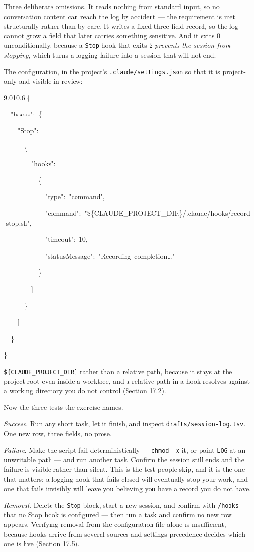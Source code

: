 \documentclass[11pt,a4paper,twoside,openany]{book}
\newcommand{\cl}[1]{\noindent\mbox{#1}\par}
\begin{document}
Three deliberate omissions. It reads nothing from standard input, so no conversation content can reach the log by accident — the requirement is met structurally rather than by care. It writes a fixed three-field record, so the log cannot grow a field that later carries something sensitive. And it exits 0 unconditionally, because a \texttt{Stop} hook that exits 2 \emph{prevents the session from stopping}, which turns a logging failure into a session that will not end.


The configuration, in the project's \texttt{.\allowbreak{}claude/\allowbreak{}settings.\allowbreak{}json} so that it is project-only and visible in review:


\begin{codeblock}{9.0}{10.6}
\cl{\{}
\cl{~~"hooks":~\{}
\cl{~~~~"Stop":~[}
\cl{~~~~~~\{}
\cl{~~~~~~~~"hooks":~[}
\cl{~~~~~~~~~~\{}
\cl{~~~~~~~~~~~~"type":~"command",}
\cl{~~~~~~~~~~~~"command":~"\$\{CLAUDE\_PROJECT\_DIR\}/.claude/hooks/record-stop.sh",}
\cl{~~~~~~~~~~~~"timeout":~10,}
\cl{~~~~~~~~~~~~"statusMessage":~"Recording~completion…"}
\cl{~~~~~~~~~~\}}
\cl{~~~~~~~~]}
\cl{~~~~~~\}}
\cl{~~~~]}
\cl{~~\}}
\cl{\}}
\end{codeblock}

\texttt{\$\{CLAUDE\_\allowbreak{}PROJECT\_\allowbreak{}DIR\}} rather than a relative path, because it stays at the project root even inside a worktree, and a relative path in a hook resolves against a working directory you do not control (Section 17.2).


Now the three tests the exercise names.


\emph{Success.} Run any short task, let it finish, and inspect \texttt{drafts/\allowbreak{}session-\allowbreak{}log.\allowbreak{}tsv}. One new row, three fields, no prose.


\emph{Failure.} Make the script fail deterministically — \texttt{chmod -\allowbreak{}x} it, or point \texttt{LOG} at an unwritable path — and run another task. Confirm the session still ends and the failure is visible rather than silent. This is the test people skip, and it is the one that matters: a logging hook that fails closed will eventually stop your work, and one that fails invisibly will leave you believing you have a record you do not have.


\emph{Removal.} Delete the \texttt{Stop} block, start a new session, and confirm with \texttt{/\allowbreak{}hooks} that no Stop hook is configured — then run a task and confirm no new row appears. Verifying removal from the configuration file alone is insufficient, because hooks arrive from several sources and settings precedence decides which one is live (Section 17.5).
\end{document}
